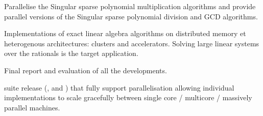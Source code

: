 \begin{workpackage}
\begin{wpdelivs}
  \begin{wpdeliv}[due=48,miles=eval,id=singular-polyarith,dissem=PU,nature=DEM, lead=UK,issue=111]
      {Parallelise the Singular sparse polynomial multiplication algorithms and
        provide parallel versions of the Singular sparse polynomial division and GCD algorithms.}
\end{wpdeliv}
  \begin{wpdeliv}[due=48,miles=eval,id=LinBox-distributed,dissem=PU,nature=DEM, lead=UJF,issue=112]
    {Implementations of exact linear algebra algorithms on distributed memory et heterogenous
      architectures: clusters and accelerators. Solving large linear systems
      over the rationals is the target application.} 
  \end{wpdeliv}
  \begin{wpdeliv}[due=48,miles=eval,id=GAP-HPC-report,dissem=PU,nature=R,lead=SA,issue=113]
      {Final report and evaluation of all the \GAP developments.}
  \end{wpdeliv}
  \begin{wpdeliv}[due=48,id=pari-hpc2,dissem=PU,nature=DEM,lead=UB,issue=114]
  {\Pari suite release (\libpari, \GP and \GPtoC) that fully support parallelisation
   allowing individual implementations to scale gracefully between single
   core / multicore / massively parallel machines.}
  \end{wpdeliv}

\end{wpdelivs}
\end{workpackage}


